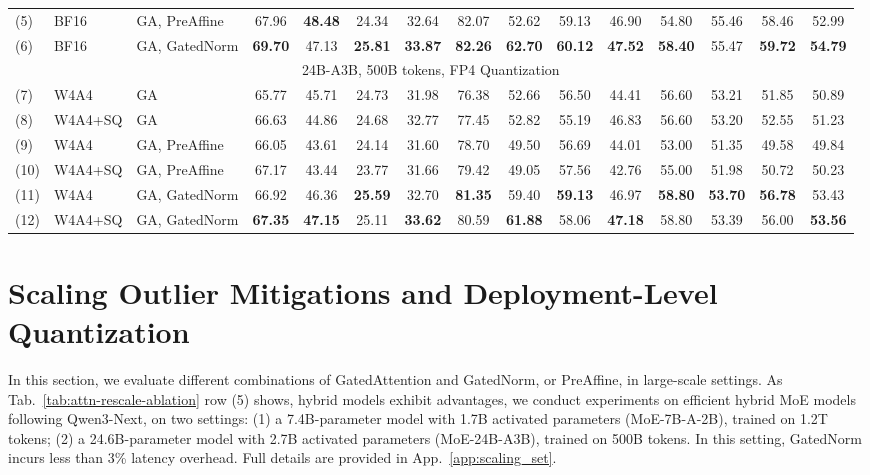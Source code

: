 \documentclass{article} %
\begin{document}
\begin{table}[!t]
{\begin{tabular}{l l l ccc ccc ccc cc c}
(5) & BF16 & GA, PreAffine & 67.96 & \textbf{48.48} & 24.34 & 32.64 & 82.07 & 52.62 & 59.13 & 46.90 & 54.80 & 55.46 & 58.46 & 52.99 \\
(6) & BF16 & GA, GatedNorm & \textbf{69.70} & 47.13 & \textbf{25.81} & \textbf{33.87} & \textbf{82.26} & \textbf{62.70} & \textbf{60.12} & \textbf{47.52} & \textbf{58.40} & 55.47 & \textbf{59.72} & \textbf{54.79} \\
\midrule
\multicolumn{15}{c}{24B-A3B, 500B tokens, FP4 Quantization} \\
\midrule
(7) & W4A4 & GA & 65.77 & 45.71 & 24.73 & 31.98 & 76.38 & 52.66 & 56.50 & 44.41 & 56.60 & 53.21 & 51.85 & 50.89 \\
(8) & W4A4+SQ & GA & 66.63 & 44.86 & 24.68 & 32.77 & 77.45 & 52.82 & 55.19 & 46.83 & 56.60 & 53.20 & 52.55 & 51.23 \\
(9) & W4A4 & GA, PreAffine & 66.05 & 43.61 & 24.14 & 31.60 & 78.70 & 49.50 & 56.69 & 44.01 & 53.00 & 51.35 & 49.58 & 49.84 \\
(10) & W4A4+SQ & GA, PreAffine & 67.17 & 43.44 & 23.77 & 31.66 & 79.42 & 49.05 & 57.56 & 42.76 & 55.00 & 51.98 & 50.72 & 50.23 \\
(11) & W4A4 & GA, GatedNorm & 66.92 & 46.36 & \textbf{25.59} & 32.70 & \textbf{81.35} & 59.40 & \textbf{59.13} & 46.97 & \textbf{58.80} & \textbf{53.70} & \textbf{56.78} & 53.43 \\
(12) & W4A4+SQ & GA, GatedNorm & \textbf{67.35} & \textbf{47.15} & 25.11 & \textbf{33.62} & 80.59 & \textbf{61.88} & 58.06 & \textbf{47.18} & 58.80 & 53.39 & 56.00 & \textbf{53.56} \\
\bottomrule
\end{tabular}
}
\vskip  -0.15in
\end{table}


\section{Scaling Outlier Mitigations and Deployment-Level Quantization}
\label{sec:scaling}

In this section, we evaluate different combinations of GatedAttention and GatedNorm, or PreAffine, in large-scale settings. 
As Tab.~\ref{tab:attn-rescale-ablation} row (5) shows, hybrid models exhibit advantages, we conduct experiments on efficient hybrid MoE models following Qwen3-Next, on two settings:  
(1) a 7.4B-parameter model with 1.7B activated parameters (MoE-7B-A-2B), trained on 1.2T tokens;  
(2) a 24.6B-parameter model with 2.7B activated parameters (MoE-24B-A3B), trained on 500B tokens.  
In this setting, GatedNorm incurs less than 3\% latency overhead.
Full details are provided in App.~\ref{app:scaling_set}.
\end{document}
